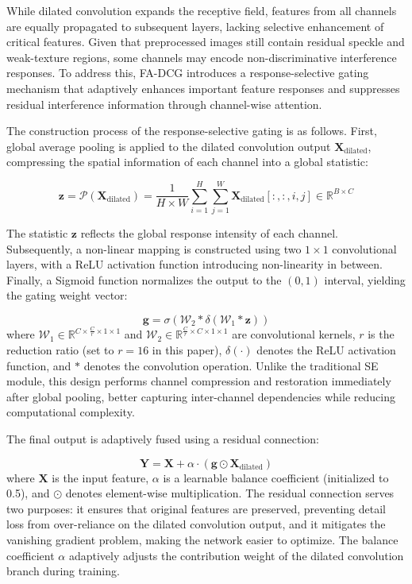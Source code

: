 \documentclass[lettersize,journal]{IEEEtran}
\begin{document}
While dilated convolution expands the receptive field, features from all channels are equally propagated to subsequent layers, lacking selective enhancement of critical features. Given that preprocessed images still contain residual speckle and weak-texture regions, some channels may encode non-discriminative interference responses. To address this, FA-DCG introduces a response-selective gating mechanism that adaptively enhances important feature responses and suppresses residual interference information through channel-wise attention.

The construction process of the response-selective gating is as follows. First, global average pooling is applied to the dilated convolution output $\mathbf{X}_{\text{dilated}}$, compressing the spatial information of each channel into a global statistic:

\begin{equation}
\mathbf{z} = \mathcal{P}(\mathbf{X}_{\text{dilated}}) = \frac{1}{H \times W} \sum_{i=1}^{H} \sum_{j=1}^{W} \mathbf{X}_{\text{dilated}}[:, :, i, j] \in \mathbb{R}^{B \times C}
\end{equation}

The statistic $\mathbf{z}$ reflects the global response intensity of each channel. Subsequently, a non-linear mapping is constructed using two $1 \times 1$ convolutional layers, with a ReLU activation function introducing non-linearity in between. Finally, a Sigmoid function normalizes the output to the $(0,1)$ interval, yielding the gating weight vector:

\begin{equation}
\mathbf{g} = \sigma\left(\mathcal{W}_2 \ast \delta\left(\mathcal{W}_1 \ast \mathbf{z}\right)\right)
\end{equation}
where $\mathcal{W}_1 \in \mathbb{R}^{C \times \frac{C}{r} \times 1 \times 1}$ and $\mathcal{W}_2 \in \mathbb{R}^{\frac{C}{r} \times C \times 1 \times 1}$ are convolutional kernels, $r$ is the reduction ratio (set to $r=16$ in this paper), $\delta(\cdot)$ denotes the ReLU activation function, and $\ast$ denotes the convolution operation. Unlike the traditional SE module, this design performs channel compression and restoration immediately after global pooling, better capturing inter-channel dependencies while reducing computational complexity.

The final output is adaptively fused using a residual connection:

\begin{equation}
\mathbf{Y} = \mathbf{X} + \alpha \cdot (\mathbf{g} \odot \mathbf{X}_{\text{dilated}})
\end{equation}
where $\mathbf{X}$ is the input feature, $\alpha$ is a learnable balance coefficient (initialized to 0.5), and $\odot$ denotes element-wise multiplication. The residual connection serves two purposes: it ensures that original features are preserved, preventing detail loss from over-reliance on the dilated convolution output, and it mitigates the vanishing gradient problem, making the network easier to optimize. The balance coefficient $\alpha$ adaptively adjusts the contribution weight of the dilated convolution branch during training.
\end{document}
